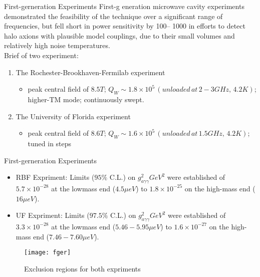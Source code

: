 \documentclass{beamer}
\begin{document}
\begin{frame}{First-gerneration Experiments}
First-g eneration microwave cavity experiments demonstrated the
feasibility of the technique over a significant range of
frequencies, but fell short in power sensitivity by 100–
1000 in efforts to detect halo axions with plausible model couplings, due to their \alert{small volumes}
and relatively \alert{high noise temperatures}.\\
Brief of two experiment:
\begin{enumerate}
\item The Rochester-Brookhaven-Fermilab experiment\\
\begin{itemize}
\item peak central field of $8.5T$; $Q_W \sim 1.8 \times 10^5 \,(unloaded\,at\,2-3GHz,\,4.2K)$; higher-TM mode; continuously swept.
\end{itemize}
\item The University of Florida experiment
\begin{itemize}
\item peak central field of $8.6T$; $Q_W \sim 1.6 \times 10^5 \,(unloaded\,at\,1.5GHz,\,4.2K)$; tuned in steps
\end{itemize}
\end{enumerate}
\end{frame}
\begin{frame}{First-gerneration Experiments}
\begin{itemize}
\item RBF Expriment: Limits ($95\%$ C.L.) on $g_{a\gamma\gamma}^2 GeV^2$
were established of $5.7 \times 10^{-28}$ at the lowmass end ($4.5\mu eV$) to $1.8\times10^{-25}$ on the high-mass end ($16\mu eV$).
\item UF Expriment: Limits ($97.5\%$ C.L.) on $g_{a\gamma\gamma}^2 GeV^2$
were established of $3.3 \times 10^{-28}$ at the lowmass end ($5.46-5.95\mu eV$) to $1.6\times10^{-27}$ on the high-mass end
($7.46-7.60\mu eV$).
\end{itemize}
\begin{figure}
    \centering
    \texttt{[image: fger]}
    \caption{Exclusion regions for both expriments}
\end{figure}
\end{frame}

\end{document}
